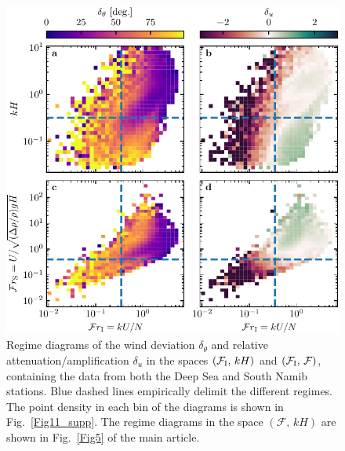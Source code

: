 \begin{figure}
  \centering
  \includegraphics[scale=1]{Figures/Figure12_supp.pdf}
  \caption{Regime diagrams of the wind deviation $\delta_{\theta}$ and relative attenuation/amplification $\delta_{u}$ in the spaces $(\mathcal{F}_{\textup{I}}, \, kH)$ and $(\mathcal{F}_{\textup{I}}, \, \mathcal{F})$, containing the data from both the Deep Sea and South Namib stations. Blue dashed lines empirically delimit the different regimes. The point density in each bin of the diagrams is shown in Fig.~\ref{Fig11_supp}. The regime diagrams in the space $(\mathcal{F}, \, kH)$ are shown in Fig.~\ref{Fig5} of the main article.}
  \label{Fig12_supp}
\end{figure}

